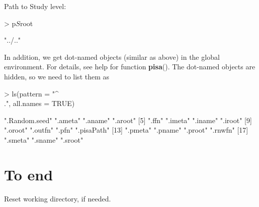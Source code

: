 \documentclass[a4paper,12pt]{article}\usepackage[]{graphicx}\usepackage[]{color}
\providecommand{\fct}[1]{{\ttfamily\textbf{#1}()}}
\begin{document}
Path to Study level:

\begin{Schunk}
\begin{Sinput}
> p$S$root
\end{Sinput}
\begin{Soutput}
[1] "../.."
\end{Soutput}
\end{Schunk}

In addition, we get  dot-named objects (similar as above) in the global environment. For details, see help for function \fct{pisa}. The dot-named objects are hidden, so we need to list them as

\begin{Schunk}
\begin{Sinput}
> ls(pattern = "^\\.", all.names = TRUE)
\end{Sinput}
\begin{Soutput}
 [1] ".Random.seed" ".ameta"       ".aname"       ".aroot"      
 [5] ".ffn"         ".imeta"       ".iname"       ".iroot"      
 [9] ".oroot"       ".outfn"       ".pfn"         ".pisaPath"   
[13] ".pmeta"       ".pname"       ".proot"       ".rnwfn"      
[17] ".smeta"       ".sname"       ".sroot"      
\end{Soutput}
\end{Schunk}


\clearpage
\section{To end}
Reset working directory, if needed.

\begin{Schunk}
\end{Schunk}


%
%

%
\end{document}
